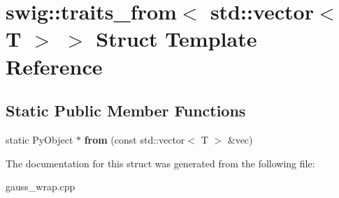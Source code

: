 \hypertarget{structswig_1_1traits__from_3_01std_1_1vector_3_01_t_01_4_01_4}{\section{swig\-:\-:traits\-\_\-from$<$ std\-:\-:vector$<$ T $>$ $>$ Struct Template Reference}
\label{structswig_1_1traits__from_3_01std_1_1vector_3_01_t_01_4_01_4}
}
\subsection*{Static Public Member Functions}
\begin{DoxyCompactItemize}
\item 
\hypertarget{structswig_1_1traits__from_3_01std_1_1vector_3_01_t_01_4_01_4_a4c2827dea351d54dea6d21c7a227134b}{static Py\-Object $\ast$ {\bfseries from} (const std\-::vector$<$ T $>$ \&vec)}\label{structswig_1_1traits__from_3_01std_1_1vector_3_01_t_01_4_01_4_a4c2827dea351d54dea6d21c7a227134b}

\end{DoxyCompactItemize}


The documentation for this struct was generated from the following file\-:\begin{DoxyCompactItemize}
\item 
gauss\-\_\-wrap.\-cpp\end{DoxyCompactItemize}
